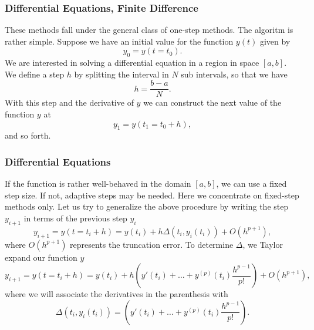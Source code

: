 \documentclass{beamer}
\begin{document}
\begin{frame}
\frametitle{Differential Equations, Finite Difference}

\begin{block}{}
These methods fall under the general class of one-step methods.
The algoritm is rather simple. 
Suppose we have an initial value for the function $y(t)$ given by
\begin{equation}
  y_0=y(t=t_0).
\end{equation}
We are interested in solving a differential equation in a region
in space $[a,b]$. We define a step $h$ by splitting the interval
in $N$ sub intervals, so that we have
\begin{equation}
  h=\frac{b-a}{N}.
\end{equation}
With this step and the derivative of $y$ we can construct the
next value of the function $y$ at
\begin{equation}
   y_1=y(t_1=t_0+h),
\end{equation}
and so forth. 
\end{block}
\end{frame}

\begin{frame}
\frametitle{Differential Equations}

\begin{block}{}
If the function is rather well-behaved in the domain
$[a,b]$, we can use a fixed step size. If not, adaptive steps 
may be needed. Here we concentrate on fixed-step
methods only. 
Let us try to generalize the above procedure by writing the 
step $y_{i+1}$ in terms of the previous step $y_i$
\begin{equation}
  y_{i+1}=y(t=t_i+h)=y(t_i) + h\Delta(t_i,y_i(t_i)) + O(h^{p+1}),
\end{equation}
where $O(h^{p+1})$ represents the truncation error. To determine 
$\Delta$, we Taylor expand our function $y$
\begin{equation}
     y_{i+1}=y(t=t_i+h)=y(t_i) + h(y'(t_i)+\dots +y^{(p)}(t_i)\frac{h^{p-1}}{p!}) + O(h^{p+1}), \label{eq:taylor}
\end{equation}
where we will associate the derivatives in the parenthesis with
\begin{equation}
\Delta(t_i,y_i(t_i))=(y'(t_i)+\dots +y^{(p)}(t_i)\frac{h^{p-1}}{p!}). \label{eq:delta}
\end{equation}
\end{block}
\end{frame}
\end{document}
